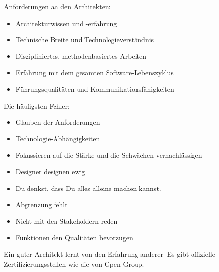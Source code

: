 Anforderungen an den Architekten:

\begin{itemize}
	\item Architekturwissen und -erfahrung
	\item Technische Breite und Technologieverständnis
	\item Diszipliniertes, methodenbasiertes Arbeiten
	\item Erfahrung mit dem gesamten Software-Lebenszyklus
	\item Führungsqualitäten und Kommunikationsfähigkeiten
\end{itemize}

Die häufigsten Fehler:
\begin{itemize}
	\item Glauben der Anforderungen
	\item Technologie-Abhängigkeiten
	\item Fokussieren auf die Stärke und die Schwächen vernachlässigen
	\item Designer designen ewig
	\item Du denkst, dass Du alles alleine machen kannst.
	\item Abgrenzung fehlt
	\item Nicht mit den Stakeholdern reden
	\item Funktionen den Qualitäten bevorzugen
\end{itemize}

Ein guter Architekt lernt von den Erfahrung anderer. Es gibt offizielle Zertifizierungsstellen wie die von Open Group.